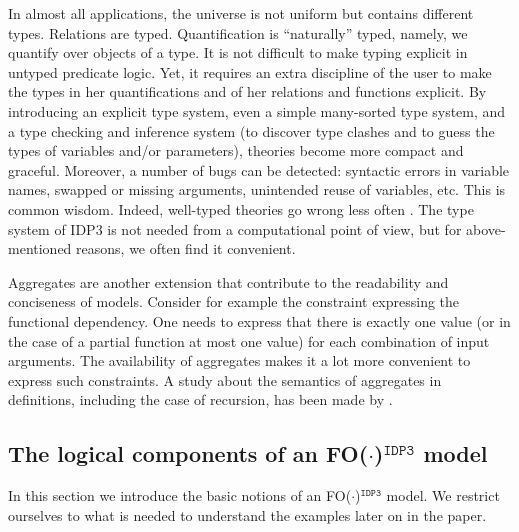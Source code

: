 \documentclass{tlp}
\newcommand{\fodotidp}{{\sc FO($\cdot$)$^{\mathtt{IDP3}}$}\xspace}
\renewcommand{\|}{\ensuremath{\,|\,}}
\renewcommand{\|}{\,|\,}
\begin{document}
In almost all applications, the universe is not uniform but contains
different types. Relations are typed. Quantification is ``naturally''
typed, namely, we quantify over objects of a type.
%
It is not difficult to make typing explicit in untyped predicate logic.
Yet, it requires an extra discipline of the user to make the
types in her quantifications and of her relations and functions explicit.
%
By introducing an explicit type system, even a simple many-sorted type
system, and a type checking and inference system (to discover type
clashes and to guess the types of variables and/or parameters), theories
become more compact and graceful. Moreover, a number of bugs can be
detected: syntactic errors in variable names, swapped or missing
arguments, unintended reuse of variables, etc. This is common wisdom. Indeed,
well-typed theories go wrong less often \cite{journals/jcss/Milner78}. The type system of
IDP3 is not needed from a computational point of view, but for above-mentioned
reasons, we often find it convenient.

Aggregates are another extension that contribute to the readability
and conciseness of models. Consider for example the constraint
expressing the functional dependency. One needs to express that there
is exactly one value (or in the case of a partial function at most one
value) for each combination of input arguments. The availability of
aggregates makes it a lot more convenient to express such
constraints. A study about the semantics of aggregates in definitions,
including the case of recursion, has been made by 
.


\subsection{The logical components of an \fodotidp model}

In this section we introduce the basic notions of an \fodotidp
model. We restrict ourselves to what is needed to understand the
examples later on in the paper.
\end{document}
